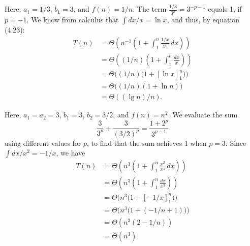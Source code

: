\subexercise
Here, $a_1=1/3$, $b_1=3$, and $f(n)=1/n$.
The term $\frac{1/3}{3^p}=3^{-p-1}$ equals 1, if $p=-1$.
We know from calculus that $\int dx/x=\ln x$, and thus, by equation (4.23):
\begin{align*}
    T(n) &= \Theta\left(n^{-1}\left(1+\int_1^n\frac{1/x}{x^0}\,dx\right)\right) \\
    &= \Theta\left((1/n)\left(1+\int_1^n\frac{dx}{x}\right)\right) \\
    &= \Theta\bigl((1/n)\bigl(1+[\ln x]_1^n\bigr)\bigr) \\
    &= \Theta\bigl((1/n)(1+\ln n)\bigr) \\
    &= \Theta((\lg n)/n).
\end{align*}

\subexercise
Here, $a_1=a_2=3$, $b_1=3$, $b_2=3/2$, and $f(n)=n^2$.
We evaluate the sum
\[
    \frac{3}{3^p}+\frac{3}{(3/2)^p} = \frac{1+2^p}{3^{p-1}}
\]
using different values for $p$, to find that the sum achieves 1 when $p=3$.
Since $\int dx/x^2=-1/x$, we have
\begin{align*}
    T(n) &= \Theta\left(n^3\left(1+\int_1^n\frac{x^2}{x^4}\,dx\right)\right) \\
    &= \Theta\left(n^3\left(1+\int_1^n\frac{dx}{x^2}\right)\right) \\
    &= \Theta\bigl(n^3\bigl(1+[-1/x]_1^n\bigr)\bigr) \\
    &= \Theta\bigl(n^3\bigl(1+(-1/n+1)\bigr)\bigr) \\
    &= \Theta(n^3(2-1/n)) \\
    &= \Theta(n^3).
\end{align*}
